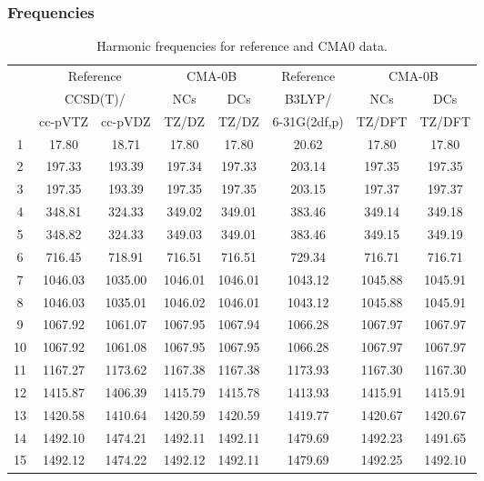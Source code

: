 \documentclass[10pt,oneside]{article}
\begin{document}
\subsubsection*{Frequencies}
\begin{table}[h!]
\centering
\caption{Harmonic frequencies for reference and CMA0 data.}
\begin{tabular}{cccccccc}
\toprule
{} & \multicolumn{2}{c}{Reference} & \multicolumn{2}{c}{CMA-0B} &    Reference & \multicolumn{2}{c}{CMA-0B} \\
{} & \multicolumn{2}{c}{CCSD(T)/} &     NCs &     DCs &       B3LYP/ &     NCs &     DCs \\
{} &   cc-pVTZ & cc-pVDZ &   TZ/DZ &   TZ/DZ & 6-31G(2df,p) &  TZ/DFT &  TZ/DFT \\
\midrule
1  &     17.80 &   18.71 &   17.80 &   17.80 &        20.62 &   17.80 &   17.80 \\
2  &    197.33 &  193.39 &  197.34 &  197.33 &       203.14 &  197.35 &  197.35 \\
3  &    197.35 &  193.39 &  197.35 &  197.35 &       203.15 &  197.37 &  197.37 \\
4  &    348.81 &  324.33 &  349.02 &  349.01 &       383.46 &  349.14 &  349.18 \\
5  &    348.82 &  324.33 &  349.03 &  349.01 &       383.46 &  349.15 &  349.19 \\
6  &    716.45 &  718.91 &  716.51 &  716.51 &       729.34 &  716.71 &  716.71 \\
7  &   1046.03 & 1035.00 & 1046.01 & 1046.01 &      1043.12 & 1045.88 & 1045.91 \\
8  &   1046.03 & 1035.01 & 1046.02 & 1046.01 &      1043.12 & 1045.88 & 1045.91 \\
9  &   1067.92 & 1061.07 & 1067.95 & 1067.94 &      1066.28 & 1067.97 & 1067.97 \\
10 &   1067.92 & 1061.08 & 1067.95 & 1067.95 &      1066.28 & 1067.97 & 1067.97 \\
11 &   1167.27 & 1173.62 & 1167.38 & 1167.38 &      1173.93 & 1167.30 & 1167.30 \\
12 &   1415.87 & 1406.39 & 1415.79 & 1415.78 &      1413.93 & 1415.91 & 1415.91 \\
13 &   1420.58 & 1410.64 & 1420.59 & 1420.59 &      1419.77 & 1420.67 & 1420.67 \\
14 &   1492.10 & 1474.21 & 1492.11 & 1492.11 &      1479.69 & 1492.23 & 1491.65 \\
15 &   1492.12 & 1474.22 & 1492.12 & 1492.11 &      1479.69 & 1492.25 & 1492.10 \\

\end{tabular}
\end{table}
\end{document}
